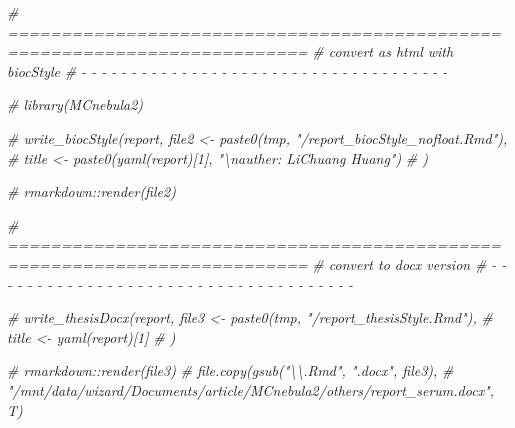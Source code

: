 \documentclass[
]{article}
\newenvironment{Shaded}{\begin{snugshade}}{\end{snugshade}}
\newcommand{\CommentTok}[1]{\textcolor[rgb]{0.56,0.35,0.01}{\textit{#1}}}
\begin{document}
\begin{Shaded}
\begin{Highlighting}[]
\CommentTok{\# ==========================================================================}
\CommentTok{\# convert as html with biocStyle}
\CommentTok{\# {-} {-} {-} {-} {-} {-} {-} {-} {-} {-} {-} {-} {-} {-} {-} {-} {-} {-} {-} {-} {-} {-} {-} {-} {-} {-} {-} {-} {-} {-} {-} {-} {-} {-} {-} {-} {-}}

\CommentTok{\# library(MCnebula2)}

\CommentTok{\# write\_biocStyle(report, file2 \textless{}{-} paste0(tmp, "/report\_biocStyle\_nofloat.Rmd"),}
\CommentTok{\#   title \textless{}{-} paste0(yaml(report)[1], "\textbackslash{}nauther: \textquotesingle{}LiChuang Huang\textquotesingle{}")}
\CommentTok{\# )}

\CommentTok{\# rmarkdown::render(file2)}
\end{Highlighting}
\end{Shaded}

\begin{Shaded}
\begin{Highlighting}[]
\CommentTok{\# ==========================================================================}
\CommentTok{\# convert to docx version}
\CommentTok{\# {-} {-} {-} {-} {-} {-} {-} {-} {-} {-} {-} {-} {-} {-} {-} {-} {-} {-} {-} {-} {-} {-} {-} {-} {-} {-} {-} {-} {-} {-} {-} {-} {-} {-} {-} {-} {-}}

\CommentTok{\# write\_thesisDocx(report, file3 \textless{}{-} paste0(tmp, "/report\_thesisStyle.Rmd"),}
\CommentTok{\#   title \textless{}{-} yaml(report)[1]}
\CommentTok{\# )}

\CommentTok{\# rmarkdown::render(file3)}
\CommentTok{\# file.copy(gsub("\textbackslash{}\textbackslash{}.Rmd", ".docx", file3),}
\CommentTok{\#   "/mnt/data/wizard/Documents/article/MCnebula2/others/report\_serum.docx", T)}
\end{Highlighting}
\end{Shaded}
\end{document}
